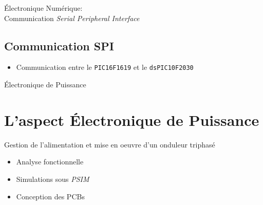 \documentclass{beamer}
\begin{document}
	\begin{frame}{Électronique Numérique:\\Communication \textit{Serial Peripheral Interface}}
		\subsection[SPI]{Communication SPI}
		\begin{itemize}
		    \item Communication entre le \texttt{PIC16F1619} et le \texttt{dsPIC10F2030}
		\end{itemize}
	\end{frame}
	
	\author[]{Florian POUTHIER}
	\begin{frame}{Électronique de Puissance}
		\section[ENPU]{L'aspect Électronique de Puissance}
		Gestion de l'alimentation et mise en oeuvre d'un onduleur triphasé
 		\begin{itemize}
			\item Analyse fonctionnelle
			\item Simulations sous \textit{PSIM}
			\item Conception des PCBs
		\end{itemize}
	\end{frame}
	
\end{document}
